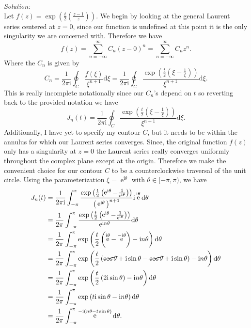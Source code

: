 \documentclass[10pt]{amsart}
\newcommand{\D}{\mathrm{d}}
\newcommand{\I}{\mathrm{i}}
\DeclareMathOperator{\E}{e}
\theoremstyle{nonumberplain}
\begin{document}
\begin{enumerate}[label={\bf {\arabic*}:}]
\noindent
\textit{Solution:} \\
Let $f(z) = \exp\left(\frac t 2 \left(\frac {z - 1} {z}\right)\right)$.
We begin by looking at the general Laurent series centered at $z=0$, since our function is undefined at this point it is the only singularity we are concerned with. Therefore we have
$$f(z) = \sum_{n=-\infty}^{\infty} C_n (z - 0)^n = \sum_{n=-\infty}^{\infty} C_n z^n.$$
Where the $C_n$ is given by
$$
C_n = \frac 1 {2 \pi \I}\oint_C \frac {f(\xi)}{\xi^{n + 1}}\D \xi
	= \frac 1 {2 \pi \I}\oint_C \frac {\exp\left(\frac t 2 \left(\xi - \frac1 \xi\right)\right)}{\xi^{n + 1}}\D \xi.
$$
This is really incomplete notationally since our $C_n$'s depend on $t$ so reverting back to the provided notation we have
$$
J_n(t) = \frac 1 {2 \pi \I}\oint_C \frac {\exp\left(\frac t 2 \left(\xi - \frac 1 \xi \right)\right)}{\xi^{n + 1}}\D \xi.
$$
Additionally, I have yet to specify my contour $C$, but it needs to be within the annulus for which our Laurent series converges.
Since, the original function $f(z)$ only has a singularity at $z=0$ the Laurent series really converges uniformly throughout the complex plane except at the origin.
Therefore we make the convenient choice for our contour $C$ to be a counterclockwise traversal of the unit circle.
Using the parameterization $\xi = \E^{\I \theta} \text{ with }\theta \in [-\pi, \pi)$, we have
\begin{align*}
J_n(t)
&= \frac 1 {2 \pi \I}\int_{-\pi}^{\pi} \frac
	{\exp\left(\frac t 2 \left(\E^{\I \theta} - \frac{1} {\E^{\I \theta}}\right)\right)}
	{\big(\E^{\I \theta}\big)^{n + 1}}
\I\E^{\I \theta} \D \theta \\
&= \frac 1 {2 \pi }\int_{-\pi}^{\pi} \frac
	{\exp\left(\frac t 2 \left(\E^{\I \theta} - \frac{1} {\E^{\I \theta}}\right)\right)}
	{\E^{\I n\theta}}
\D \theta \\
&= \frac 1 {2 \pi }\int_{-\pi}^{\pi} \exp\left(\frac t 2 \left( \E^{\I \theta} - \E^{-\I \theta}\right) - \I n\theta\right) \D \theta \\
&= \frac 1 {2 \pi }\int_{-\pi}^{\pi} \exp\left(
	\frac t 2 \left( \cancel{\cos\theta} + \I \sin \theta - \cancel{\cos\theta} +\I \sin\theta\right) - \I n\theta
\right) \D \theta \\
&= \frac 1 {2 \pi }\int_{-\pi}^{\pi} \exp\left(
	\frac t 2 \left( 2\I \sin \theta\right) - \I n\theta
\right) \D \theta \\
&= \frac 1 {2 \pi }\int_{-\pi}^{\pi} \exp\left( t \I \sin \theta - \I n\theta \right) \D \theta \\
&= \frac 1 {2 \pi }\int_{-\pi}^{\pi} \E^{-\I(n\theta - t \sin \theta)} \D \theta.

\end{align*}
\end{enumerate}
\end{document}
